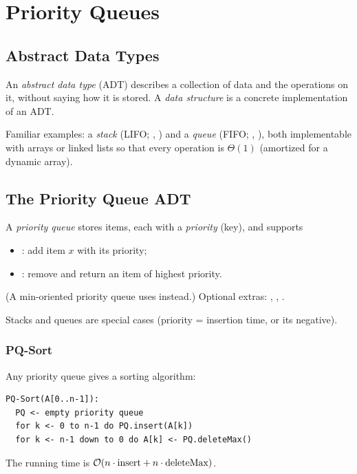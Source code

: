 \chapter{Priority Queues}


\section{Abstract Data Types}

\begin{definition}
An \emph{abstract data type} (ADT) describes a collection of data and the
operations on it, without saying how it is stored. A \emph{data structure} is a
concrete implementation of an ADT.
\end{definition}

Familiar examples: a \emph{stack} (LIFO; , ) and a
\emph{queue} (FIFO; , ), both implementable with
arrays or linked lists so that every operation is $\Theta(1)$ (amortized for a
dynamic array).

\section{The Priority Queue ADT}

\begin{definition}
A \emph{priority queue} stores items, each with a \emph{priority} (key), and
supports
\begin{itemize}
  \item {}: add item $x$ with its priority;
  \item {}: remove and return an item of highest priority.
\end{itemize}
(A min-oriented priority queue uses  instead.) Optional extras:
, , .
\end{definition}

Stacks and queues are special cases (priority = insertion time, or its negative).

\subsection{PQ-Sort}

Any priority queue gives a sorting algorithm:
\begin{lstlisting}
PQ-Sort(A[0..n-1]):
  PQ <- empty priority queue
  for k <- 0 to n-1 do PQ.insert(A[k])
  for k <- n-1 down to 0 do A[k] <- PQ.deleteMax()
\end{lstlisting}
The running time is $\mathcal{O}(n \cdot \text{insert} + n \cdot \text{deleteMax})$.

